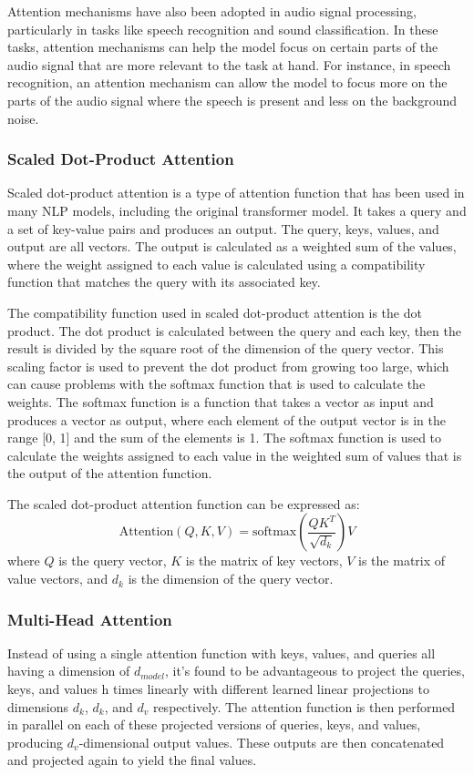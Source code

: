 Attention mechanisms have also been adopted in audio signal processing, particularly in tasks like speech recognition and sound classification. In these tasks, attention mechanisms can help the model focus on certain parts of the audio signal that are more relevant to the task at hand. For instance, in speech recognition, an attention mechanism can allow the model to focus more on the parts of the audio signal where the speech is present and less on the background noise.

\subsubsection{Scaled Dot-Product Attention}
Scaled dot-product attention is a type of attention function that has been used in many NLP models, including the original transformer model. It takes a query and a set of key-value pairs and produces an output. The query, keys, values, and output are all vectors. The output is calculated as a weighted sum of the values, where the weight assigned to each value is calculated using a compatibility function that matches the query with its associated key.

The compatibility function used in scaled dot-product attention is the dot product. The dot product is calculated between the query and each key, then the result is divided by the square root of the dimension of the query vector. This scaling factor is used to prevent the dot product from growing too large, which can cause problems with the softmax function that is used to calculate the weights. The softmax function is a function that takes a vector as input and produces a vector as output, where each element of the output vector is in the range [0, 1] and the sum of the elements is 1. The softmax function is used to calculate the weights assigned to each value in the weighted sum of values that is the output of the attention function.

The scaled dot-product attention function can be expressed as:
\begin{equation} \label{eq:dot-product-attention}
    \text{Attention}(Q, K, V) = \text{softmax}(\frac{QK^T}{\sqrt{d_k}})V
\end{equation}
where $Q$ is the query vector, $K$ is the matrix of key vectors, $V$ is the matrix of value vectors, and $d_k$ is the dimension of the query vector.

\subsubsection{Multi-Head Attention}
Instead of using a single attention function with keys, values, and queries all having a dimension of $d_{model}$, it's found to be advantageous to project the queries, keys, and values h times linearly with different learned linear projections to dimensions $d_k$, $d_k$, and $d_v$ respectively. The attention function is then performed in parallel on each of these projected versions of queries, keys, and values, producing $d_v$-dimensional output values. These outputs are then concatenated and projected again to yield the final values.


